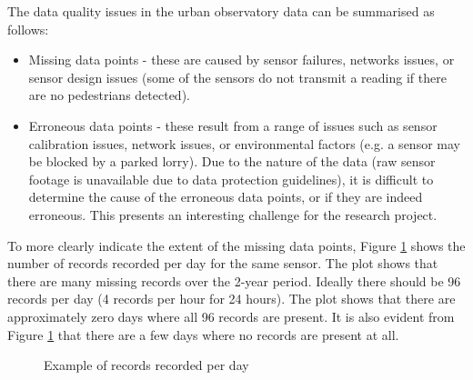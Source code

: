 The data quality issues in the urban observatory data can be summarised as follows:

\begin{itemize}
    \item Missing data points - these are caused by sensor failures, networks issues, or sensor design issues (some of the sensors do not transmit a reading if there are no pedestrians detected).
    \item Erroneous data points - these result from a range of issues such as sensor calibration issues, network issues, or environmental factors (e.g. a sensor may be blocked by a parked lorry). Due to the nature of the data (raw sensor footage is unavailable due to data protection guidelines), it is difficult to determine the cause of the erroneous data points, or if they are indeed erroneous. This presents an interesting challenge for the research project.
\end{itemize}

To more clearly indicate the extent of the missing data points, Figure \ref{fig:records_per_day_example} shows the number of records recorded per day for the same sensor. The plot shows that there are many missing records over the 2-year period. Ideally there should be 96 records per day (4 records per hour for 24 hours). The plot shows that there are approximately zero days where all 96 records are present. It is also evident from Figure \ref{fig:records_per_day_example} that there are a few days where no records are present at all.

\begin{figure}[H]
    \centering
    \caption{Example of records recorded per day}
    \label{fig:records_per_day_example}
\end{figure}

